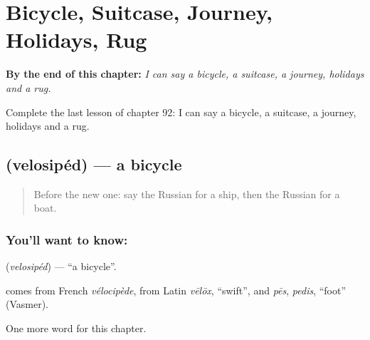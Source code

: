 
\chapter{Bicycle, Suitcase, Journey, Holidays, Rug}
\label{ch:ru-bicycle-suitcase-journey-holidays-rug}

\begin{chapteropening}
\textbf{By the end of this chapter:} \emph{I can say a bicycle, a suitcase, a journey, holidays and a rug.}

Complete the last lesson of chapter 92: I can say a bicycle, a suitcase, a journey, holidays and a rug.
\end{chapteropening}

\section[\texorpdfstring{\ru{велосипед} (velosipéd)}{велосипед (velosipéd)}]{ (velosipéd) — a bicycle}

\label{lesson:RU-C92-bicycle}



\begin{quote}
Before the new one: say the Russian for a ship, then the Russian for a boat.
\end{quote}

\subsection*{You'll want to know: }
\textbf{} (\emph{velosipéd}) — \textquotedblleft{}a bicycle\textquotedblright{}.

\begin{cousinweb}
\textbf{} comes from French \emph{vélocipède}, from Latin \emph{vēlōx}, \textquotedblleft{}swift\textquotedblright{}, and \emph{pēs}, \emph{pedis}, \textquotedblleft{}foot\textquotedblright{} (Vasmer).
\end{cousinweb}

\begin{grammarlens}[title={What you've built}]
One more word for this chapter.
\end{grammarlens}

